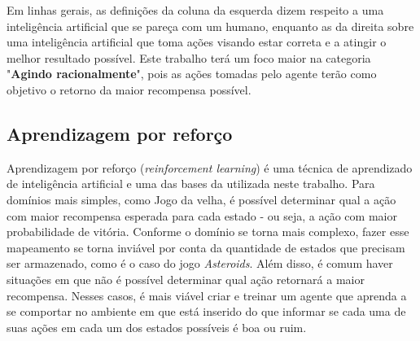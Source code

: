 \bigskip Em linhas gerais, as definições da coluna da esquerda dizem respeito a uma inteligência artificial que se pareça com um humano, enquanto as da direita sobre uma inteligência artificial que toma ações visando estar correta e a atingir o melhor resultado possível. Este trabalho terá um foco maior na categoria "\textbf{Agindo racionalmente}", pois as ações tomadas pelo agente terão como objetivo o retorno da maior recompensa possível.





\subsection{Aprendizagem por reforço}
\label{sec:rl}

Aprendizagem por reforço (\textit{reinforcement learning}) é uma técnica de aprendizado de inteligência artificial e uma das bases da utilizada neste trabalho.
Para domínios mais simples, como Jogo da velha, é possível determinar qual a ação com maior recompensa esperada para cada estado - ou seja, a ação com maior probabilidade de vitória.
Conforme o domínio se torna mais complexo, fazer esse mapeamento se torna inviável por conta da quantidade de estados que precisam ser armazenado, como é o caso do jogo \textit{Asteroids}. Além disso, é comum haver situações em que não é possível determinar qual ação retornará a maior recompensa.
Nesses casos, é mais viável criar e treinar um agente que aprenda a se comportar no ambiente em que está inserido do que informar se cada uma de suas ações em cada um dos estados possíveis é boa ou ruim.

